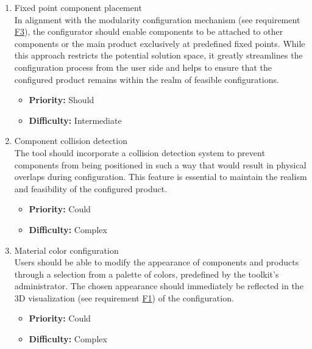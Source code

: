 \begin{enumerate}[label=\textbf{F\arabic*:}, leftmargin=*]
\item \label{itm:F6} Fixed point component placement
\vspace{2pt}
\\In alignment with the modularity configuration mechanism (see requirement \hyperref[itm:F3]{F3}), the configurator should enable components to be attached to other components or the main product exclusively at predefined fixed points. While this approach restricts the potential solution space, it greatly streamlines the configuration process from the user side and helps to ensure that the configured product remains within the realm of feasible configurations.
\begin{itemize}[noitemsep, label=\trianglebullet]
    \item \textbf{Priority:} Should
    \item \textbf{Difficulty:} Intermediate
\end{itemize}
\vspace{4pt}

\item \label{itm:F7} Component collision detection
\vspace{2pt}
\\The tool should incorporate a collision detection system to prevent components from being positioned in such a way that would result in physical overlaps during configuration. This feature is essential to maintain the realism and feasibility of the configured product.
\begin{itemize}[noitemsep, label=\trianglebullet]
    \item \textbf{Priority:} Could
    \item \textbf{Difficulty:} Complex
\end{itemize}
\vspace{4pt}

\item \label{itm:F8} Material color configuration
\vspace{2pt}
\\Users should be able to modify the appearance of components and products through a selection from a palette of colors, predefined by the toolkit's administrator. The chosen appearance should immediately be reflected in the 3D visualization (see requirement \hyperref[itm:F1]{F1}) of the configuration.
\begin{itemize}[noitemsep, label=\trianglebullet]
    \item \textbf{Priority:} Could
    \item \textbf{Difficulty:} Complex
\end{itemize}
\vspace{4pt}


\end{enumerate}
